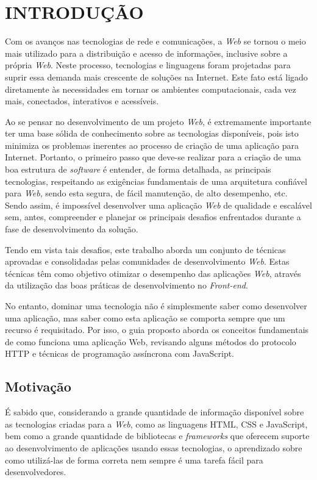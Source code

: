 \chapter{INTRODUÇÃO}
\label{Introducao}

Com os avanços nas tecnologias de rede e comunicações, a \textit{Web} se tornou o meio mais utilizado para a distribuição e acesso de informações, inclusive sobre a própria \textit{Web}. Neste processo, tecnologias e linguagens foram projetadas para suprir essa demanda mais crescente de soluções na Internet. Este fato está ligado diretamente às necessidades em tornar os ambientes computacionais, cada vez mais, conectados, interativos e acessíveis.

Ao se pensar no desenvolvimento de um projeto \textit{Web}, é extremamente importante ter uma base sólida de conhecimento sobre as tecnologias disponíveis, pois isto minimiza os problemas inerentes ao processo de criação de uma aplicação para Internet. Portanto, o primeiro passo que deve-se realizar para a criação de uma boa estrutura de \textit{software} é entender, de forma detalhada, as principais tecnologias, respeitando as exigências fundamentais de uma arquitetura confiável para \textit{Web}, sendo esta segura, de fácil manutenção, de alto desempenho, etc. Sendo assim, é impossível desenvolver uma aplicação \textit{Web} de qualidade e escalável sem, antes, compreender e planejar os principais desafios enfrentados durante a fase de desenvolvimento da solução.

Tendo em vista tais desafios, este trabalho aborda um conjunto de técnicas aprovadas e consolidadas pelas comunidades de desenvolvimento \textit{Web}. Estas técnicas têm como objetivo otimizar o desempenho das aplicações \textit{Web}, através da utilização das boas práticas de desenvolvimento no \textit{Front-end}.

No entanto, dominar uma tecnologia não é simplesmente saber como desenvolver uma aplicação, mas saber como esta aplicação se comporta sempre que um recurso é requisitado. Por isso, o guia proposto aborda os conceitos fundamentais de como funciona uma aplicação Web, revisando alguns métodos do protocolo HTTP e técnicas de programação assíncrona com JavaScript.

\section{Motivação}
\label{Motivacao}

É sabido que, considerando a grande quantidade de informação disponível sobre as tecnologias criadas para a \textit{Web}, como as linguagens HTML, CSS e JavaScript, bem como a grande quantidade de bibliotecas e \textit{frameworks} que oferecem suporte ao desenvolvimento de aplicações usando essas tecnologias, o aprendizado sobre como utilizá-las de forma correta nem sempre é uma tarefa fácil para desenvolvedores.

